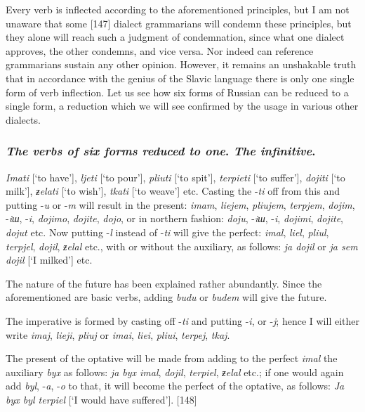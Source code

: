 Every verb is inflected according to the aforementioned principles, but I am not unaware that some [147] dialect grammarians will condemn these principles, but they alone will reach such a judgment of condemnation, since what one dialect approves, the other condemns, and vice versa. Nor indeed can reference grammarians sustain any other opinion. However, it remains an unshakable truth that in accordance with the genius of the Slavic language there is only one single form of verb inflection. Let us see how six forms of Russian can be reduced to a single form, a reduction which we will see confirmed by the usage in various other dialects.

\subsubsection*{\textit{The verbs of six forms reduced to one}. \textit{The infinitive}.}

\textit{Imati} [‘to have’], \textit{ljeti} [‘to pour’], \textit{pliuti} [‘to spit’], \textit{terpieti} [‘to suffer’], \textit{dojiti} [‘to milk’], \textit{ƶelati} [‘to wish’], \textit{tkati} [‘to weave’] etc. Casting the -\textit{ti} off from this and putting -\textit{u} or -\textit{m} will result in the present: \textit{imam}, \textit{liejem}, \textit{pliujem}, \textit{terpjem}, \textit{dojim}, \linebreak{}-\textit{iш}, -\textit{i}, \textit{dojimo}, \textit{dojite}, \textit{dojo}, or in northern fashion: \textit{doju}, -\textit{iш}, -\textit{i}, \textit{dojimi}, \textit{dojite}, \textit{dojut} etc. Now putting -\textit{l} instead of -\textit{ti} will give the perfect: \textit{imal}, \textit{liel}, \textit{pliul}, \textit{terpjel}, \textit{dojil}, \textit{ƶelal} etc., with or without the auxiliary, as follows: \textit{ja dojil} or \textit{ja sem dojil} [‘I milked’] etc.

The nature of the future has been explained rather abundantly. Since the aforementioned are basic verbs, adding \textit{budu} or \textit{budem} will give the future.

The imperative is formed by casting off -\textit{ti} and putting -\textit{i}, or -\textit{j}; hence I will either write \textit{imaj}, \textit{lieji}, \textit{pliuj} or \textit{imai}, \textit{liei}, \textit{pliui}, \textit{terpej}, \textit{tkaj}.

The present of the optative will be made from adding to the perfect \textit{imal} the auxiliary \textit{byx} as follows: \textit{ja byx imal}, \textit{dojil}, \textit{terpiel}, \textit{ƶelal} etc.; if one would again add \textit{byl}, -\textit{a}, -\textit{o} to that, it will become the perfect of the optative, as follows: \textit{Ja byx byl terpiel} [‘I would have suffered’]. [148]


